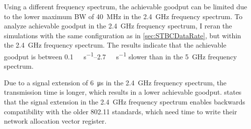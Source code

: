 Using a different frequency spectrum, the achievable goodput can be limited due to the lower maximum \ac{BW} of \SI{40}{\mega\hertz} in the \SI{2.4}{\giga\hertz} frequency spectrum.
To analyze achievable goodput in the \SI{2.4}{\giga\hertz} frequency spectrum, I reran the simulations with the same configuration as in \autoref{sec:STBCDataRate}, but within the \SI{2.4}{\giga\hertz} frequency spectrum.
The results indicate that the achievable goodput is between \SIrange{0.1}{2.7}{\mega\bit\per\second} slower than in the \SI{5}{\giga\hertz} frequency spectrum.

Due to a signal extension of \SI{6}{\micro\second} in the \SI{2.4}{\giga\hertz} frequency spectrum, the transmission time is longer, which results in a lower achievable goodput.
\cite{ieee_standard_2009n} states that the signal extension in the \SI{2.4}{\giga\hertz} frequency spectrum enables
backwards compatibility with the older 802.11 standards, which need time to write their network allocation vector register.

